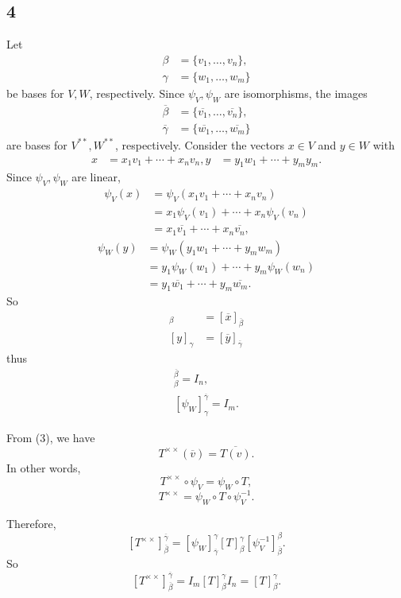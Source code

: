\documentclass[12pt]{article}
\begin{document}
\subsection*{4}
Let
\begin{align*}
    \beta   &= \{v_1, \dots, v_n\}, \\
    \gamma  &= \{w_1, \dots, w_m\}
\end{align*}
be bases for $V,W$, respectively. Since $\psi_V, \psi_W$ are isomorphisms, the images
\begin{align*}
    \overline{\beta}    &= \{\overline{v_1}, \dots, \overline{v_n}\}, \\
    \overline{\gamma}   &= \{\overline{w_1}, \dots, \overline{w_m}\}
\end{align*}
are bases for $V^{**},W^{**}$, respectively. Consider the vectors $x\in V$ and $y\in W$ with
\begin{align*}
    x &= x_1v_1 + \cdots + x_nv_n,
    y &= y_1w_1 + \cdots + y_my_m.
\end{align*}
Since $\psi_V, \psi_W$ are linear,
\begin{align*}
    \psi_V(x)   &= \psi_V(x_1v_1 + \cdots + x_nv_n) \\
                &= x_1\psi_V(v_1) + \cdots + x_n\psi_V(v_n) \\
                &= x_1\overline{v_1} + \cdots + x_n\overline{v_n},
\end{align*}
\begin{align*}
    \psi_W(y)   &= \psi_W(y_1w_1 + \cdots + y_mw_m) \\
                &= y_1\psi_W(w_1) + \cdots + y_m\psi_W(w_n) \\
                &= y_1\overline{w_1} + \cdots + y_m\overline{w_m}.
\end{align*}
So
\begin{align*}
    [x]_\beta &= [\overline{x}]_{\overline{\beta}} \\
    [y]_\gamma &= [\overline{y}]_{\overline{\gamma}}
\end{align*}
thus
\begin{align*}
    [\psi_V]_\beta^{\overline{\beta}} = I_n, \\
    [\psi_W]_\gamma^{\overline{\gamma}} = I_m.
\end{align*}

From (3), we have
\[T^{\times\times}(\overline{v}) = \overline{T(v)}.\]
In other words,
\[T^{\times\times} \circ \psi_V = \psi_W \circ T,\]
\[T^{\times\times}  = \psi_W \circ T \circ \psi_V^{-1}.\]

Therefore,
\[[T^{\times\times}]_{\overline{\beta}}^{\overline{\gamma}} = [\psi_W]_{\overline{\gamma}}^\gamma [T]_\beta^\gamma [\psi_V^{-1}]_{\overline{\beta}}^\beta.\]
So 
\[[T^{\times\times}]_{\overline{\beta}}^{\overline{\gamma}} = I_m[T]_\beta^\gamma I_n = [T]_\beta^\gamma.\]
\end{document}
